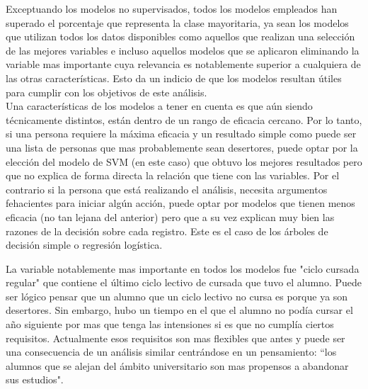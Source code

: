 Exceptuando los modelos no supervisados, todos los modelos empleados han superado el porcentaje que representa la clase mayoritaria, ya sean los modelos que utilizan todos los datos disponibles como aquellos que realizan una selección de las mejores variables e incluso aquellos modelos que se aplicaron eliminando la variable mas importante cuya relevancia es notablemente superior a cualquiera de las otras características. Esto da un indicio de que los modelos resultan útiles para cumplir con los objetivos de este análisis.\\

Una características de los modelos a tener en cuenta es que aún siendo  técnicamente distintos, están dentro de un rango de eficacia cercano. Por lo tanto, si una persona requiere la máxima eficacia y un resultado simple como puede ser una lista de personas que mas probablemente sean desertores, puede optar por la elección del modelo de SVM (en este caso) que obtuvo los mejores resultados pero que no explica de forma directa la relación que tiene con las variables. Por el contrario si la persona que está realizando el análisis, necesita argumentos fehacientes para iniciar algún acción, puede optar por modelos que tienen menos eficacia (no tan lejana del anterior) pero que a su vez explican muy bien las razones de la decisión sobre cada registro. Este es el caso de los árboles de decisión simple o regresión logística.

La variable notablemente mas importante en todos los modelos fue "ciclo cursada regular" que contiene el último ciclo lectivo de cursada que tuvo el alumno. Puede ser lógico pensar que un alumno que un ciclo lectivo no cursa es porque ya son desertores. Sin embargo, hubo un tiempo en el que el alumno no podía cursar el año siguiente por mas que tenga las intensiones si es que no cumplía ciertos requisitos. Actualmente esos requisitos son mas flexibles que antes y puede ser una consecuencia de un análisis similar centrándose en un pensamiento: ``los alumnos que se alejan del ámbito universitario son mas propensos a abandonar sus estudios".